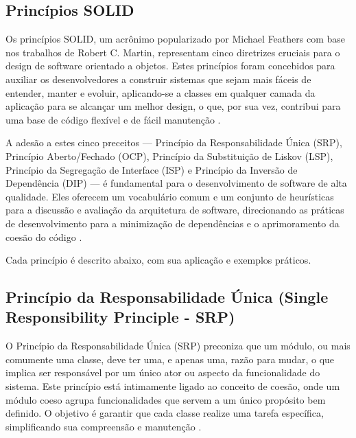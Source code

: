 \subsection{Princípios SOLID}

    \par Os princípios SOLID, um acrônimo popularizado por Michael Feathers com base nos trabalhos de Robert C. Martin, representam cinco diretrizes cruciais para o design de software orientado a objetos. Estes princípios foram concebidos para auxiliar os desenvolvedores a construir sistemas que sejam mais fáceis de entender, manter e evoluir, aplicando-se a classes em qualquer camada da aplicação para se alcançar um melhor design, o que, por sua vez, contribui para uma base de código flexível e de fácil manutenção \cite{livro:joshi:2016}.

    \par A adesão a estes cinco preceitos — Princípio da Responsabilidade Única (SRP), Princípio Aberto/Fechado (OCP), Princípio da Substituição de Liskov (LSP), Princípio da Segregação de Interface (ISP) e Princípio da Inversão de Dependência (DIP) — é fundamental para o desenvolvimento de software de alta qualidade. Eles oferecem um vocabulário comum e um conjunto de heurísticas para a discussão e avaliação da arquitetura de software, direcionando as práticas de desenvolvimento para a minimização de dependências e o aprimoramento da coesão do código \cite{artigo:ramachandrappa:2024}.
    
    \par Cada princípio é descrito abaixo, com sua aplicação e exemplos práticos.

%
%
%
%
    
\subsection{Princípio da Responsabilidade Única (Single Responsibility Principle - SRP)}
    
    \par O Princípio da Responsabilidade Única (SRP) preconiza que um módulo, ou mais comumente uma classe, deve ter uma, e apenas uma, razão para mudar, o que implica ser responsável por um único ator ou aspecto da funcionalidade do sistema. Este princípio está intimamente ligado ao conceito de coesão, onde um módulo coeso agrupa funcionalidades que servem a um único propósito bem definido. O objetivo é garantir que cada classe realize uma tarefa específica, simplificando sua compreensão e manutenção \cite{livro:martin:cleanarch}.

